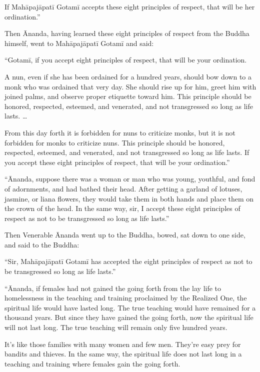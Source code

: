 \documentclass[12pt,openany]{book}%
\begin{document}
If \textsanskrit{Mahāpajāpatī} \textsanskrit{Gotamī} accepts these eight principles of respect, that will be her ordination.” 

Then Ānanda, having learned these eight principles of respect from the Buddha himself, went to \textsanskrit{Mahāpajāpatī} \textsanskrit{Gotamī} and said: 

“\textsanskrit{Gotamī}, if you accept eight principles of respect, that will be your ordination. 

A nun, even if she has been ordained for a hundred years, should bow down to a monk who was ordained that very day. She should rise up for him, greet him with joined palms, and observe proper etiquette toward him. This principle should be honored, respected, esteemed, and venerated, and not transgressed so long as life lasts. … 

From this day forth it is forbidden for nuns to criticize monks, but it is not forbidden for monks to criticize nuns. This principle should be honored, respected, esteemed, and venerated, and not transgressed so long as life lasts. If you accept these eight principles of respect, that will be your ordination.” 

“Ānanda, suppose there was a woman or man who was young, youthful, and fond of adornments, and had bathed their head. After getting a garland of lotuses, jasmine, or liana flowers, they would take them in both hands and place them on the crown of the head. In the same way, sir, I accept these eight principles of respect as not to be transgressed so long as life lasts.” 

Then Venerable Ānanda went up to the Buddha, bowed, sat down to one side, and said to the Buddha: 

“Sir, \textsanskrit{Mahāpajāpatī} \textsanskrit{Gotamī} has accepted the eight principles of respect as not to be transgressed so long as life lasts.” 

“Ānanda, if females had not gained the going forth from the lay life to homelessness in the teaching and training proclaimed by the Realized One, the spiritual life would have lasted long. The true teaching would have remained for a thousand years. But since they have gained the going forth, now the spiritual life will not last long. The true teaching will remain only five hundred years. 

It’s like those families with many women and few men. They’re easy prey for bandits and thieves. In the same way, the spiritual life does not last long in a teaching and training where females gain the going forth. 
\end{document}
